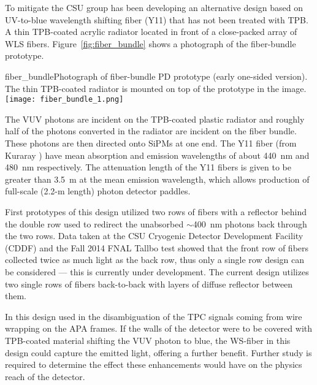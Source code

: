 To mitigate%
the CSU group has
been developing an alternative design based on UV-to-blue
wavelength shifting fiber (Y11) that has not been treated with TPB.  A
thin TPB-coated acrylic radiator located in front of a close-packed
array of WLS fibers. Figure~\ref{fig:fiber_bundle} shows a photograph of the
fiber-bundle prototype. 

\begin{cdrfigure}{fiber_bundle}{Photograph of fiber-bundle PD prototype (early one-sided
  version). The thin TPB-coated radiator is mounted on top of the
  prototype in the image.}
  \texttt{[image: fiber\_bundle\_1.png]}
\end{cdrfigure}


The VUV photons are incident on the TPB-coated plastic radiator and
roughly half of the photons converted in the radiator are incident on
the %
fiber bundle. %
These photons are then directed onto SiPMs at one end. The Y11 fiber (from Kuraray ) have
mean absorption and emission wavelengths of about 440~nm and 480~nm
respectively.  The attenuation length of the Y11 fibers is given to be
greater than 3.5~m at the mean emission wavelength, which allows
production of full-scale (2.2-m length) photon detector paddles.

First prototypes of this design utilized two rows of fibers with a
reflector behind the double row used to redirect the unabsorbed $\sim$400~nm photons back
through the two rows.%
Data taken at the CSU Cryogenic Detector Development
Facility (CDDF) and the Fall 2014 FNAL Tallbo test 
showed that the front row of fibers collected
twice as much light as the back row, thus
only a single row
design can be considered --- this is currently under development. The current design
utilizes two single rows of fibers back-to-back with layers of %
diffuse reflector between them.


In this design  %
used in the disambiguation of the TPC signals coming from wire
wrapping on the APA frames. 
If the walls of the detector were to be 
covered with TPB-coated material shifting the VUV photon to blue,
 the WS-fiber in this design could capture the emitted light, offering 
 a further benefit. Further study is
required to determine the effect these enhancements would have on the physics
reach of the detector. 

